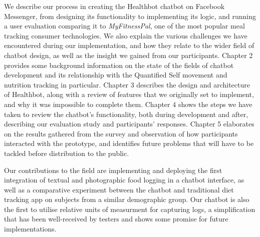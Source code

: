 We describe our process in creating the Healthbot chatbot on Facebook Messenger, from designing its functionality to implementing its logic, and running a user evaluation comparing it to \textit{MyFitnessPal}, one of the most popular meal tracking consumer technologies. We also explain the various challenges we have encountered during our implementation, and how they relate to the wider field of chatbot design, as well as the insight we gained from our participants. Chapter 2 provides some background information on the state of the fields of chatbot development and its relationship with the Quantified Self movement and nutrition tracking in particular. Chapter 3 describes the design and architecture of Healthbot, along with a review of features that we originally set to implement, and why it was impossible to complete them. Chapter 4 shows the steps we have taken to review the chatbot's functionality, both during development and after, describing our evaluation study and participants' responses. Chapter 5 elaborates on the results gathered from the survey and observation of how participants interacted with the prototype, and identifies future problems that will have to be tackled before distribution to the public.

Our contributions to the field are implementing and deploying the first integration of textual and photographic food logging in a chatbot interface, as well as a comparative experiment between the chatbot and traditional diet tracking app on subjects from a similar demographic group. Our chatbot is also the first to utilise relative units of measurment for capturing logs, a simplification that has been well-received by testers and shows some promise for future implementations.
